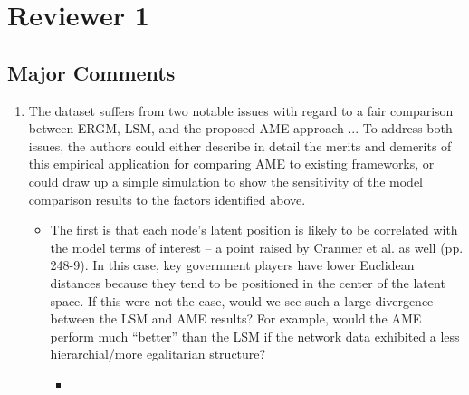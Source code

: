 \section{Reviewer 1}

\subsection{Major Comments}

\begin{enumerate}
	\item  The dataset suffers from two notable issues with regard to a fair comparison between ERGM, LSM, and the proposed AME approach ... To address both issues, the authors could either describe in detail the merits and demerits of this empirical application for comparing AME to existing frameworks, or could draw up a simple simulation to show the sensitivity of the model comparison results to the factors identified above.
	\begin{itemize}
		\item The first is that each node’s latent position is likely to be correlated with the model terms of interest – a point raised by Cranmer et al. as well (pp. 248-9). In this case, key government players have lower Euclidean distances because they tend to be positioned in the center of the latent space. If this were not the case, would we see such a large divergence between the LSM and AME results? For example, would the AME perform much ``better'' than the LSM if the network data exhibited a less hierarchial/more egalitarian structure? 
			\begin{itemize}
				\item \textcolor{blue}{ \emph{
}}
\end{itemize}
\end{itemize}
\end{enumerate}
